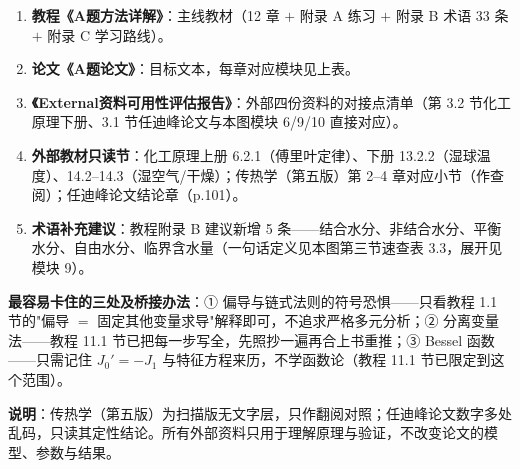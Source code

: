 \documentclass[12pt,a4paper]{ctexart}
\begin{document}
\begin{enumerate}[leftmargin=2em]
\item \textbf{教程《A题方法详解》}：主线教材（12 章 $+$ 附录 A 练习 $+$ 附录 B 术语 33 条 $+$ 附录 C 学习路线）。
\item \textbf{论文《A题论文》}：目标文本，每章对应模块见上表。
\item \textbf{《External资料可用性评估报告》}：外部四份资料的对接点清单（第 3.2 节化工原理下册、3.1 节任迪峰论文与本图模块 6/9/10 直接对应）。
\item \textbf{外部教材只读节}：化工原理上册 6.2.1（傅里叶定律）、下册 13.2.2（湿球温度）、14.2--14.3（湿空气/干燥）；传热学（第五版）第 2--4 章对应小节（作查阅）；任迪峰论文结论章（p.101）。
\item \textbf{术语补充建议}：教程附录 B 建议新增 5 条——结合水分、非结合水分、平衡水分、自由水分、临界含水量（一句话定义见本图第三节速查表 3.3，展开见模块 9）。
\end{enumerate}

\textbf{最容易卡住的三处及桥接办法}：① 偏导与链式法则的符号恐惧——只看教程 1.1 节的"偏导 $=$ 固定其他变量求导"解释即可，不追求严格多元分析；② 分离变量法——教程 11.1 节已把每一步写全，先照抄一遍再合上书重推；③ Bessel 函数——只需记住 $J_0'=-J_1$ 与特征方程来历，不学函数论（教程 11.1 节已限定到这个范围）。

\textbf{说明}：传热学（第五版）为扫描版无文字层，只作翻阅对照；任迪峰论文数字多处乱码，只读其定性结论。所有外部资料只用于理解原理与验证，不改变论文的模型、参数与结果。
\end{document}
